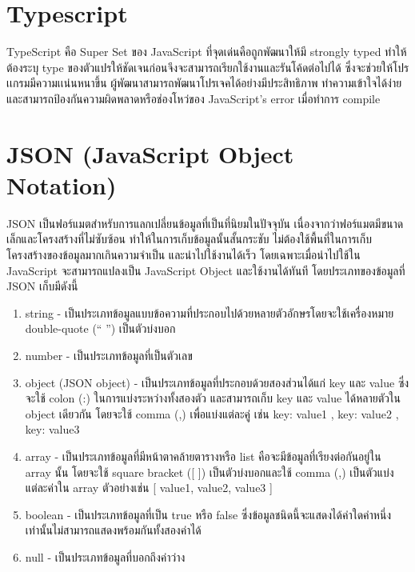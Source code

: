\section{Typescript}
TypeScript\cite{type} คือ Super Set ของ JavaScript ที่จุดเด่นคือถูกพัฒนาให้มี strongly typed ทําให้ต้องระบุ type ของตัวแปรให้ชัดเจนก่อนจึงจะสามารถเรียกใช้งานและรันโค้ดต่อไปได้ ซึ่งจะช่วยให้โปรเเกรมมีความเเน่นหนาขึ้น ผู้พัฒนาสามารถพัฒนาโปรเจคได้อย่างมีประสิทธิภาพ ทำความเข้าใจได้ง่าย และสามารถป้องกันความผิดพลาดหรือช่องโหว่ของ JavaScript’s error เมื่อทำการ compile 

\section{JSON (JavaScript Object Notation)}
JSON\cite{json} เป็นฟอร์แมตสำหรับการแลกเปลี่ยนข้อมูลที่เป็นที่นิยมในปัจจุบัน เนื่องจากว่าฟอร์แมตมีขนาดเล็กและโครงสร้างที่ไม่ซับซ้อน 
ทำให้ในการเก็บข้อมูลนั้นสั้นกระชับ ไม่ต้องใช้พื้นที่ในการเก็บโครงสร้างของข้อมูลมากเกินความจำเป็น และนำไปใช้งานได้เร็ว โดยเฉพาะเมื่อนำไปใช้ใน 
JavaScript จะสามารถแปลงเป็น JavaScript Object และใช้งานได้ทันที โดยประเภทของข้อมูลที่ JSON เก็บมีดังนี้
\begin{enumerate}
  \item string - เป็นประเภทข้อมูลแบบข้อความที่ประกอบไปด้วยหลายตัวอักษรโดยจะใช้เครื่องหมาย double-quote (“ ”) เป็นตัวบ่งบอก
  \item number - เป็นประเภทข้อมูลที่เป็นตัวเลข
  \item object (JSON object) - เป็นประเภทข้อมูลที่ประกอบด้วยสองส่วนได้แก่ key และ value ซึ่งจะใช้ colon (:) ในการแบ่งระหว่างทั้งสองตัว และสามารถเก็บ key และ value ได้หลายตัวใน object เดียวกัน โดยจะใช้ comma (,) เพื่อแบ่งแต่ละคู่ เช่น 
  { key: value1 , key: value2 , key: value3}
  \item array - เป็นประเภทข้อมูลที่มีหน้าตาคล้ายตารางหรือ list คือจะมีข้อมูลที่เรียงต่อกันอยู่ใน array นั้น โดยจะใช้ square bracket ([ ]) เป็นตัวบ่งบอกและใช้ comma (,) เป็นตัวแบ่งแต่ละค่าใน array ตัวอย่างเช่น [ value1, value2, value3 ]
  \item boolean - เป็นประเภทข้อมูลที่เป็น true หรือ false ซึ่งข้อมูลชนิดนี้จะแสดงได้ค่าใดค่าหนึ่งเท่านั้นไม่สามารถแสดงพร้อมกันทั้งสองค่าได้
  \item null - เป็นประเภทข้อมูลที่บอกถึงค่าว่าง
\end{enumerate}


